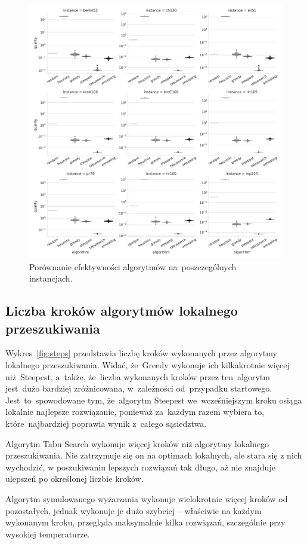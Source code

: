 \begin{figure}[H]
\begin{center}
\includegraphics[width=1.0\textwidth]{graphs/quality_comparison_letval.pdf}
\end{center}
\caption{Porównanie efektywności algorytmów na~poszczególnych instancjach.}
\label{fig:quality}
\end{figure}

\subsection{Liczba kroków algorytmów lokalnego przeszukiwania}

Wykres~\ref{fig:steps} przedstawia liczbę kroków wykonanych przez algorytmy lokalnego przeszukiwania. Widać, że~Greedy wykonuje ich kilkakrotnie więcej niż~Steepest, a~także, że~liczba wykonanych kroków przez ten~algorytm jest~dużo bardziej zróżnicowana, w~zależności od~przypadku startowego. Jest~to~spowodowane tym, że~algorytm Steepest we~wcześniejszym kroku osiąga lokalnie najlepsze rozwiązanie, ponieważ za~każdym razem wybiera to, które~najbardziej poprawia wynik z~całego sąsiedztwa.

{\color{part2}
Algorytm Tabu Search wykonuje więcej kroków niż algorytmy lokalnego przeszukiwania. Nie zatrzymuje się on na optimach lokalnych, ale stara się z nich wychodzić, w poszukiwaniu lepszych rozwiązań tak długo, aż nie znajduje ulepszeń po określonej liczbie kroków.

Algorytm symulowanego wyżarzania wykonuje wielokrotnie więcej kroków od pozostałych, jednak wykonuje je dużo szybciej -- właściwie na każdym wykonanym kroku, przegląda maksymalnie kilka rozwiązań, szczególnie przy wysokiej temperaturze.
}

